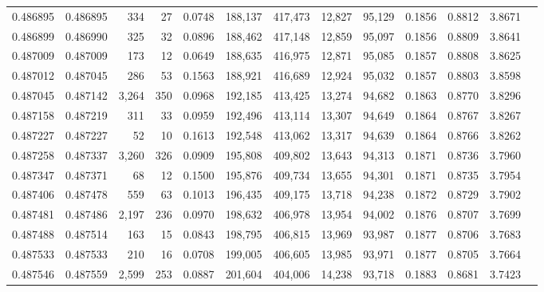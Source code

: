 \begin{tabular}{rrrrrrrrrrrrr}
0.486895 & 0.486895 &   334 &    27 &                                     0.0748 & 188,137 & 417,473 &  12,827 &  95,129 & 0.1856 & 0.8812 & 3.8671 \\
0.486899 & 0.486990 &   325 &    32 &                                     0.0896 & 188,462 & 417,148 &  12,859 &  95,097 & 0.1856 & 0.8809 & 3.8641 \\
0.487009 & 0.487009 &   173 &    12 &                                     0.0649 & 188,635 & 416,975 &  12,871 &  95,085 & 0.1857 & 0.8808 & 3.8625 \\
0.487012 & 0.487045 &   286 &    53 &                                     0.1563 & 188,921 & 416,689 &  12,924 &  95,032 & 0.1857 & 0.8803 & 3.8598 \\
0.487045 & 0.487142 & 3,264 &   350 &                                     0.0968 & 192,185 & 413,425 &  13,274 &  94,682 & 0.1863 & 0.8770 & 3.8296 \\
0.487158 & 0.487219 &   311 &    33 &                                     0.0959 & 192,496 & 413,114 &  13,307 &  94,649 & 0.1864 & 0.8767 & 3.8267 \\
0.487227 & 0.487227 &    52 &    10 &                                     0.1613 & 192,548 & 413,062 &  13,317 &  94,639 & 0.1864 & 0.8766 & 3.8262 \\
0.487258 & 0.487337 & 3,260 &   326 &                                     0.0909 & 195,808 & 409,802 &  13,643 &  94,313 & 0.1871 & 0.8736 & 3.7960 \\
0.487347 & 0.487371 &    68 &    12 &                                     0.1500 & 195,876 & 409,734 &  13,655 &  94,301 & 0.1871 & 0.8735 & 3.7954 \\
0.487406 & 0.487478 &   559 &    63 &                                     0.1013 & 196,435 & 409,175 &  13,718 &  94,238 & 0.1872 & 0.8729 & 3.7902 \\
0.487481 & 0.487486 & 2,197 &   236 &                                     0.0970 & 198,632 & 406,978 &  13,954 &  94,002 & 0.1876 & 0.8707 & 3.7699 \\
0.487488 & 0.487514 &   163 &    15 &                                     0.0843 & 198,795 & 406,815 &  13,969 &  93,987 & 0.1877 & 0.8706 & 3.7683 \\
0.487533 & 0.487533 &   210 &    16 &                                     0.0708 & 199,005 & 406,605 &  13,985 &  93,971 & 0.1877 & 0.8705 & 3.7664 \\
0.487546 & 0.487559 & 2,599 &   253 &                                     0.0887 & 201,604 & 404,006 &  14,238 &  93,718 & 0.1883 & 0.8681 & 3.7423 \\

\end{tabular}
